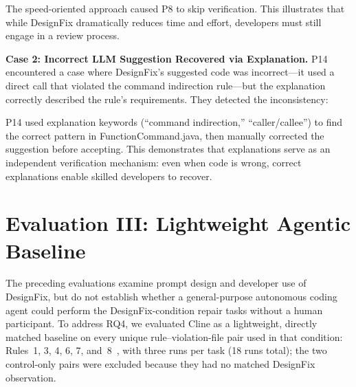 
\noindent The speed-oriented approach caused P8 to skip verification. This illustrates that while DesignFix dramatically reduces time and effort, developers must still engage in a review process.

\textbf{Case 2: Incorrect LLM Suggestion Recovered via Explanation.} P14 encountered a case where DesignFix's suggested code was incorrect---it used a direct call that violated the command indirection rule---but the explanation correctly described the rule's requirements.
They detected the inconsistency: 


\noindent P14 used explanation keywords (``command indirection,'' ``caller/callee'') to find the correct pattern in FunctionCommand.java, then manually corrected the suggestion before accepting. This demonstrates that explanations serve as an independent verification mechanism: even when code is wrong, correct explanations enable skilled developers to recover.

\section{Evaluation III: Lightweight Agentic Baseline}
\label{sec:agentic-baseline}

The preceding evaluations examine prompt design and developer use of
DesignFix, but do not establish whether a general-purpose autonomous
coding agent could perform the DesignFix-condition repair tasks without
a human participant. To address RQ4, we evaluated Cline as a lightweight,
directly matched baseline on every unique rule--violation-file pair used
in that condition: Rules~1, 3, 4, 6, 7, and~8~\cite{cline2026}, with
three runs per task (18 runs total); the two control-only pairs were
excluded because they had no matched DesignFix observation. 

